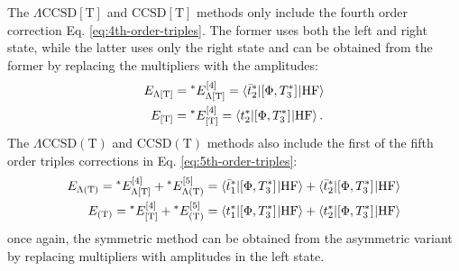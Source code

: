 The $\Lambda\text{CCSD}[\text{T}]$\autocite{Eriksen2015-il} and
$\text{CCSD}[\text{T}]$\autocite{Urban1985-xp} methods only include the
fourth order correction Eq. \eqref{eq:4th-order-triples}.
The former uses both the left and right state, while the latter uses
only the right state and can be obtained from the former by replacing
the multipliers with the amplitudes:\autocite{Koch1997-nm,
Eriksen2015-il}
\begin{subequations}\label{eq:brackets-t}
  \begin{align}
    E_{\Lambda\text{[T]}} &= {}^* E^{[4]}_{\Lambda\text{[T]}} =
    \braket{\bar{t}_{2}^{*}| [ \Phi, T_3^{*} ]^{} | \mathrm{HF}} \\
    E_{\text{[T]}} &= {}^* E^{[4]}_{\text{[T]}} = \braket{t_{2}^{*}|
    [ \Phi, T_3^{*} ]^{} | \mathrm{HF}}.
  \end{align}
\end{subequations}
The $\Lambda\text{CCSD}(\text{T})$\autocite{Kucharski1998-qq,
Kucharski1998-oi, Crawford1998-vj} and
$\text{CCSD}(\text{T})$\autocite{Raghavachari1989-bn} methods also
include the first of the fifth order triples corrections in Eq.
\eqref{eq:5th-order-triples}:
\begin{subequations}\label{eq:parentheses-t}
 \begin{align}
  E_{\Lambda(\text{T})} = {}^* E^{[4]}_{\Lambda\text{[T]}} + {}^* E^{[5]}_{\Lambda\text{(T)}}
  &=
    \braket{\bar{t}_{1}^{*} | [ \Phi, T_3^{*} ]^{} | \mathrm{HF}}
    +
    \braket{\bar{t}_{2}^{*}| [ \Phi, T_3^{*} ]^{} | \mathrm{HF}}
    \\
  E_{(\text{T})} = {}^* E^{[4]}_{\text{[T]}} + {}^* E^{[5]}_{\text{(T)}}
  &=
    \braket{t_{1}^{*} | [ \Phi, T_3^{*} ]^{} | \mathrm{HF}}
    +
    \braket{t_{2}^{*}| [ \Phi, T_3^{*} ]^{} | \mathrm{HF}}
 \end{align}
\end{subequations}
once again, the symmetric method can be obtained from the asymmetric
variant by replacing multipliers with amplitudes in the left state.


